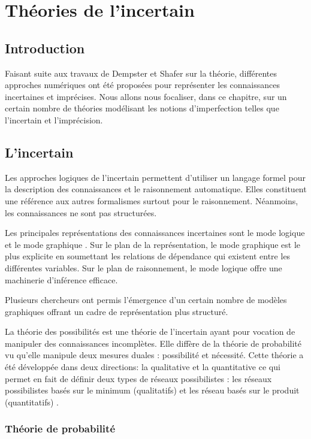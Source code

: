 \chapter{Théories de l'incertain}

{}
\section*{Introduction}
Faisant suite aux travaux de Dempster et Shafer sur la théorie, différentes approches numériques ont été
proposées pour représenter les connaissances incertaines et imprécises. Nous allons nous focaliser, dans ce chapitre, sur un certain nombre de théories modélisant les notions d’imperfection telles que l’incertain et l’imprécision.

\section{L’incertain}

Les approches logiques de l’incertain permettent d’utiliser un langage formel pour la description des connaissances et le raisonnement automatique. Elles constituent une référence aux autres formalismes surtout pour le raisonnement. Néanmoins, les connaissances ne  sont pas structurées.

Les principales représentations des connaissances incertaines sont le mode logique et le mode graphique \cite{hkhallafiThesis}.
Sur le plan de la représentation, le mode graphique est le plus explicite en soumettant les relations de dépendance qui existent entre les différentes variables. Sur le plan de raisonnement, le mode logique offre une machinerie d’inférence efficace.

Plusieurs chercheurs ont permis l’émergence d’un certain nombre de modèles graphiques offrant un cadre de représentation plus structuré.

La théorie des possibilités est une théorie de l’incertain ayant pour vocation de manipuler des connaissances incomplètes. Elle diffère de la théorie de probabilité  vu qu'elle manipule deux mesures duales : possibilité et nécessité. Cette théorie a été développée dans deux directions: la qualitative et la quantitative ce qui permet en fait de définir deux types de réseaux  possibilistes : les réseaux possibilistes basés sur le minimum (qualitatifs) et les réseau basés sur le produit (quantitatifs) \cite{hkhallafiThesis}\cite{kZebouchi2Thesis}.
\subsection{Théorie de probabilité}

